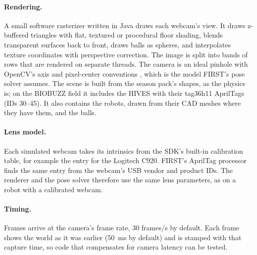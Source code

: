 \documentclass[10pt,twocolumn,letterpaper]{article}
\begin{document}
\paragraph{Rendering.} A small software rasterizer written in Java draws each webcam's view. It draws z-buffered triangles with flat, textured or procedural floor shading, blends transparent surfaces back to front, draws balls as spheres, and interpolates texture coordinates with perspective correction. The image is split into bands of rows that are rendered on separate threads. The camera is an ideal pinhole with OpenCV's axis and pixel-center conventions \citep{hartley2004multiple,bradski2000opencv}, which is the model FIRST's pose solver assumes. The scene is built from the season pack's shapes, as the physics is; on the BIOBUZZ field it includes the HIVES with their tag36h11 AprilTags (IDs 30–45). It also contains the robots, drawn from their CAD meshes where they have them, and the balls.

\paragraph{Lens model.} Each simulated webcam takes its intrinsics from the SDK's built-in calibration table, for example the entry for the Logitech C920. FIRST's AprilTag processor finds the same entry from the webcam's USB vendor and product IDs. The renderer and the pose solver therefore use the same lens parameters, as on a robot with a calibrated webcam.

\paragraph{Timing.} Frames arrive at the camera's frame rate, 30 frames/s by default. Each frame shows the world as it was  earlier (50~ms by default) and is stamped with that capture time, so code that compensates for camera latency can be tested.
\end{document}
